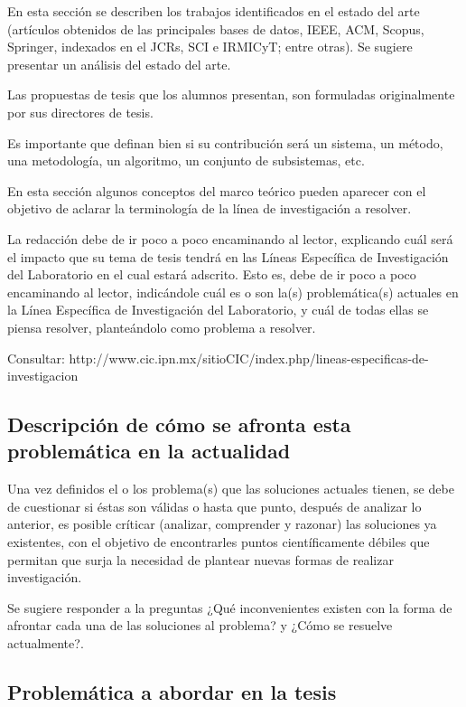 \documentclass[runningheads,a4paper]{book}
\begin{document}
En esta sección se describen los trabajos identificados en el estado del arte (artículos obtenidos de las principales bases de datos, IEEE, ACM, Scopus, Springer, indexados en el JCRs, SCI e IRMICyT; entre otras). Se sugiere presentar un análisis del estado del arte. 

Las propuestas de tesis que los alumnos presentan, son formuladas originalmente por sus directores de tesis.

Es importante que definan bien si su contribución será un sistema, un método, una metodología, un algoritmo, un conjunto de subsistemas, etc. 

En esta sección algunos conceptos del marco teórico pueden aparecer con el objetivo de aclarar la terminología de la línea de investigación a resolver. 

La redacción debe de ir poco a poco encaminando al lector, explicando cuál será el impacto que su tema de tesis tendrá en las Líneas Específica de Investigación del Laboratorio en el cual estará adscrito.  Esto es, debe de ir poco a poco encaminando al lector, indicándole cuál es o son la(s) problemática(s) actuales en la Línea Específica de Investigación del Laboratorio, y cuál de todas ellas se piensa resolver, planteándolo como problema a resolver.

Consultar: http://www.cic.ipn.mx/sitioCIC/index.php/lineas-especificas-de-investigacion

\subsection{Descripción de cómo se afronta esta problemática en la actualidad}

Una vez definidos el o los problema(s) que las soluciones actuales tienen, se debe de cuestionar si éstas son válidas o hasta que punto, después de analizar lo anterior, es posible críticar (analizar, comprender y razonar) las soluciones ya existentes, con el objetivo de encontrarles puntos científicamente débiles que permitan que surja la necesidad de plantear nuevas formas de realizar investigación. 

Se sugiere responder a la preguntas ¿Qué inconvenientes existen con la forma de afrontar cada una de las soluciones al problema? y ¿Cómo se resuelve actualmente?.

\subsection{Problemática a abordar en la tesis}
\end{document}
